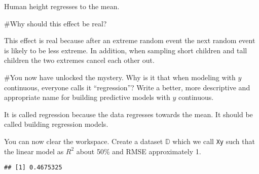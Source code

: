 \documentclass[
]{article}
\newenvironment{Shaded}{\begin{snugshade}}{\end{snugshade}}
\newcommand{\AttributeTok}[1]{\textcolor[rgb]{0.77,0.63,0.00}{#1}}
\newcommand{\DecValTok}[1]{\textcolor[rgb]{0.00,0.00,0.81}{#1}}
\newcommand{\FunctionTok}[1]{\textcolor[rgb]{0.00,0.00,0.00}{#1}}
\newcommand{\NormalTok}[1]{#1}
\newcommand{\OtherTok}[1]{\textcolor[rgb]{0.56,0.35,0.01}{#1}}
\newcommand{\SpecialCharTok}[1]{\textcolor[rgb]{0.00,0.00,0.00}{#1}}
\begin{document}
Human height regresses to the mean.

\#Why should this effect be real?

This effect is real because after an extreme random event the next
random event is likely to be less extreme. In addition, when sampling
short children and tall children the two extremes cancel each other out.

\#You now have unlocked the mystery. Why is it that when modeling with
\(y\) continuous, everyone calls it ``regression''? Write a better, more
descriptive and appropriate name for building predictive models with
\(y\) continuous.

It is called regression because the data regresses towards the mean. It
should be called building regression models.

You can now clear the workspace. Create a dataset \(\mathbb{D}\) which
we call \texttt{Xy} such that the linear model as \(R^2\) about 50\% and
RMSE approximately 1.

\begin{Shaded}
\end{Shaded}

\begin{verbatim}
## [1] 0.4675325
\end{verbatim}

\begin{Shaded}
\end{Shaded}
\end{document}
